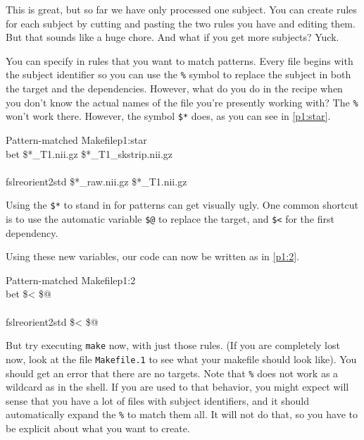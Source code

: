 This is great, but so far we have only processed one subject. You can
create rules for each subject by cutting and pasting the two rules you
have and editing them. But that sounds like a huge chore. And what if
you get more subjects? Yuck.

You can specify in rules that you want to match patterns. Every file
begins with the subject identifier so you can use the \texttt{\%}
symbol to replace the subject in both the target and the
dependencies. However, what do you do in the
recipe when you don't know the actual names of the file you're
presently working with? The \texttt{\%} won't work there. However, the
symbol \texttt{\$*} does, as you can see in \autoref{p1:star}. 

\begin{make}{Pattern-matched Makefile}{p1:star}
	 \\
	\tab bet \$*_T1.nii.gz \$*_T1_skstrip.nii.gz \\
	
	\\
	\tab fslreorient2std \$*_raw.nii.gz \$*_T1.nii.gz
\end{make}

Using the \texttt{\$*} to stand in for patterns can get visually ugly. One common
shortcut is to use the automatic variable \texttt{\$@} to replace the
target, and \texttt{\$<} for the first dependency.


Using these new variables, our code can now be written as in \autoref{p1:2}.
\begin{make}{Pattern-matched Makefile}{p1:2}
	 \\
	\tab bet \$< \$@ \\
	
	\\
	\tab fslreorient2std \$< \$@
\end{make}


But try executing \texttt{make} now, with just those rules. (If you are completely lost now, look at the file \texttt{Makefile.1} to see what your makefile should look like). You should
get an error that there are no targets. Note that \texttt{\%} does not
work as a wildcard as in the \bashn{} shell. If you are used to that
behavior, you might expect \maken{} will sense that you have a lot of
files with subject identifiers, and it should automatically expand the
\texttt{\%} to match them all. It will not do that, so you have to be
explicit about what you want to create.

